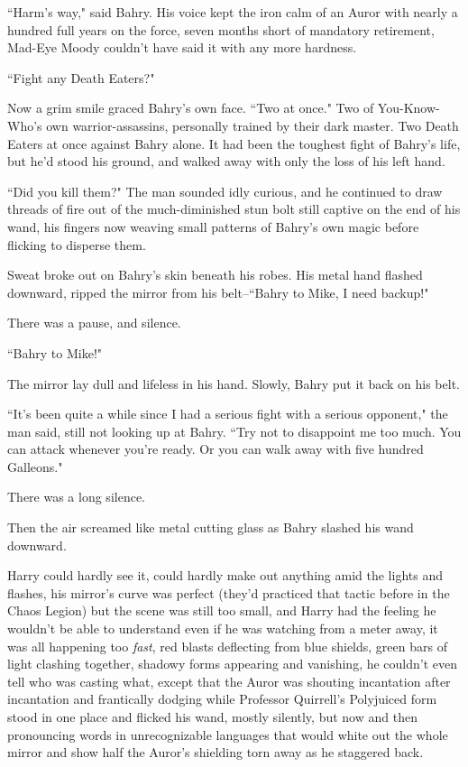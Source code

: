 ``Harm's way," said Bahry. His voice kept the iron calm of an Auror with nearly a hundred full years on the force, seven months short of mandatory retirement, Mad-Eye Moody couldn't have said it with any more hardness.

``Fight any Death Eaters?"

Now a grim smile graced Bahry's own face. ``Two at once." Two of You-Know-Who's own warrior-assassins, personally trained by their dark master. Two Death Eaters at once against Bahry alone. It had been the toughest fight of Bahry's life, but he'd stood his ground, and walked away with only the loss of his left hand.

``Did you kill them?" The man sounded idly curious, and he continued to draw threads of fire out of the much-diminished stun bolt still captive on the end of his wand, his fingers now weaving small patterns of Bahry's own magic before flicking to disperse them.

Sweat broke out on Bahry's skin beneath his robes. His metal hand flashed downward, ripped the mirror from his belt\---``Bahry to Mike, I need backup!"

There was a pause, and silence.

``Bahry to Mike!"

The mirror lay dull and lifeless in his hand. Slowly, Bahry put it back on his belt.

``It's been quite a while since I had a serious fight with a serious opponent," the man said, still not looking up at Bahry. ``Try not to disappoint me too much. You can attack whenever you're ready. Or you can walk away with five hundred Galleons."

There was a long silence.

Then the air screamed like metal cutting glass as Bahry slashed his wand downward.

\later

Harry could hardly see it, could hardly make out anything amid the lights and flashes, his mirror's curve was perfect (they'd practiced that tactic before in the Chaos Legion) but the scene was still too small, and Harry had the feeling he wouldn't be able to understand even if he was watching from a meter away, it was all happening too \emph{fast}, red blasts deflecting from blue shields, green bars of light clashing together, shadowy forms appearing and vanishing, he couldn't even tell who was casting what, except that the Auror was shouting incantation after incantation and frantically dodging while Professor Quirrell's Polyjuiced form stood in one place and flicked his wand, mostly silently, but now and then pronouncing words in unrecognizable languages that would white out the whole mirror and show half the Auror's shielding torn away as he staggered back.

